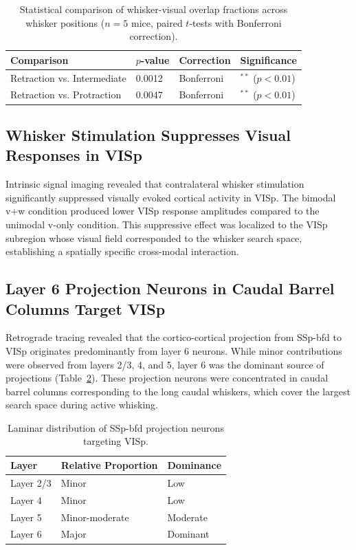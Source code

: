 \documentclass[11pt]{article}
\begin{document}
\begin{table}[htbp]
\centering
\caption{Statistical comparison of whisker-visual overlap fractions across whisker positions ($n = 5$ mice, paired $t$-tests with Bonferroni correction).}
\label{tab:overlap}
\begin{tabular}{llll}
\toprule
Comparison & $p$-value & Correction & Significance \\
\midrule
Retraction vs. Intermediate & 0.0012 & Bonferroni & $^{**}$ ($p < 0.01$) \\
Retraction vs. Protraction & 0.0047 & Bonferroni & $^{**}$ ($p < 0.01$) \\
\bottomrule
\end{tabular}
\end{table}

\subsection{Whisker Stimulation Suppresses Visual Responses in VISp}

Intrinsic signal imaging revealed that contralateral whisker stimulation significantly suppressed visually evoked cortical activity in VISp. The bimodal v+w condition produced lower VISp response amplitudes compared to the unimodal v-only condition. This suppressive effect was localized to the VISp subregion whose visual field corresponded to the whisker search space, establishing a spatially specific cross-modal interaction.

\subsection{Layer 6 Projection Neurons in Caudal Barrel Columns Target VISp}

Retrograde tracing revealed that the cortico-cortical projection from SSp-bfd to VISp originates predominantly from layer 6 neurons. While minor contributions were observed from layers 2/3, 4, and 5, layer 6 was the dominant source of projections (Table~\ref{tab:laminar}). These projection neurons were concentrated in caudal barrel columns corresponding to the long caudal whiskers, which cover the largest search space during active whisking.

\begin{table}[htbp]
\centering
\caption{Laminar distribution of SSp-bfd projection neurons targeting VISp.}
\label{tab:laminar}
\begin{tabular}{lll}
\toprule
Layer & Relative Proportion & Dominance \\
\midrule
Layer 2/3 & Minor & Low \\
Layer 4 & Minor & Low \\
Layer 5 & Minor-moderate & Moderate \\
Layer 6 & Major & Dominant \\
\bottomrule
\end{tabular}
\end{table}
\end{document}
